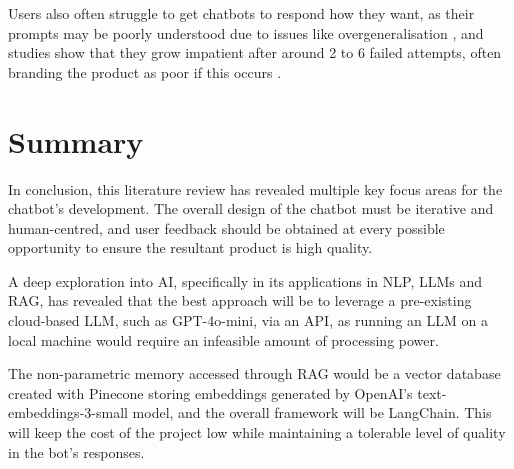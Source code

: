 Users also often struggle to get chatbots to respond how they want, as their prompts may be poorly understood
due to issues like overgeneralisation \autocite{zamfirescu-pereira_why_2023}, and studies show that they
grow impatient after around 2 to 6 failed attempts, often branding the product as poor if this occurs \autocite{luger_like_2016}.

\section{Summary}

In conclusion, this literature review has revealed multiple key focus areas for the chatbot's development. 
The overall design of the chatbot must be iterative and human-centred, and user feedback should 
be obtained at every possible opportunity to ensure the resultant product is high quality.

A deep exploration into AI, specifically in its applications in NLP, LLMs and RAG, has revealed that the best approach 
will be to leverage a pre-existing cloud-based LLM, such as GPT-4o-mini, via an API, as running an LLM on a local machine would 
require an infeasible amount of processing power.

The non-parametric memory accessed through RAG would be a vector database created with Pinecone storing embeddings generated by OpenAI's text-embeddings-3-small 
model, and the overall framework will be LangChain. This will keep the cost of the project low while maintaining a tolerable level of quality in the bot's responses.

\nocite{IBMAIDef}
\nocite{UXDict}
\nocite{ICOAIDef}
\nocite{IBMGenAI}
\nocite{MITGenAI}
\nocite{CloudflareLLM}
\nocite{IBMNLP}
\nocite{aws_what_nodate}
\nocite{databricks_retrieval_2023}
\nocite{elastic_what_nodate}
\nocite{confident_ai_llm_nodate}
\nocite{metaFaissLibraryEfficient2017}